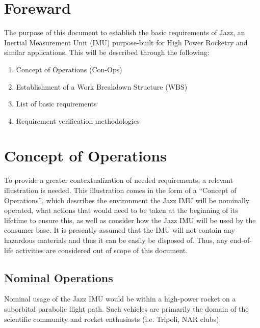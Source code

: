 \documentclass[14pt,a4paper]{article}
\begin{document}
	
	\begin{CenturySchool}
		
		
		\tableofcontents
		
		\section{Foreward}
		The purpose of this document to establish the basic requirements of Jazz, an Inertial Measurement Unit (IMU) purpose-built for High Power Rocketry and similar applications. This will be described through the following:

		\begin{enumerate}
			\item Concept of Operations (Con-Ops)
			\item Establishment of a Work Breakdown Structure (WBS)
			\item List of basic requirements
			\item Requirement verification methodologies
		\end{enumerate}
		
		\section{Concept of Operations}
		To provide a greater contextualization of needed requirements, a relevant illustration is needed. This illustration comes in the form of a “Concept of Operations”, which describes the environment the Jazz IMU will be nominally operated, what actions that would need to be taken at the beginning of its lifetime to ensure this, as well as consider how the Jazz IMU will be used by the consumer base. It is presently assumed that the IMU will not contain any hazardous materials and thus it can be easily be disposed of. Thus, any end-of-life activities are considered out of scope of this document.
		
		\subsection{Nominal Operations}
		Nominal usage of the Jazz IMU would be within a high-power rocket on a suborbital parabolic flight path. Such vehicles are primarily the domain of the scientific community and rocket enthusiasts (i.e. Tripoli, NAR clubs).
		


\end{CenturySchool}
\end{document}
